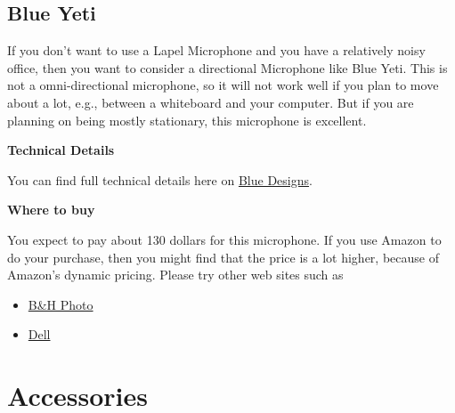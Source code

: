 \subsection{Blue Yeti}

\begin{gram}
If you don't want to use a Lapel Microphone and you have a relatively
noisy office, then you want to consider a directional Microphone like Blue Yeti.
%
This is not a omni-directional microphone, so it will not work well if you plan to move about a lot, e.g., between a whiteboard and your computer.  
%
But if you are planning on being mostly stationary, this microphone is excellent.

\textbf{Technical Details}

You can find full technical details here on \href{https://www.bluedesigns.com/products/yeti/}{Blue Designs}.


\textbf{Where to buy}

You expect to pay about 130 dollars for this microphone.  If you use Amazon to do your purchase, then you might find that the price is a lot higher, because of Amazon's dynamic pricing.  Please try other web sites such as 

\begin{itemize}
\item
\href{
https://www.bhphotovideo.com/c/product/1252288-REG/blue_yeti_whiteout_yeti_usb_microphone_whiteout.html/?ap=y&ap=y&smp=y&smp=y&lsft=BI%
\item 
\href{https://www.dell.com/en-us/shop/blue-microphones-yeti-microphone-usb-aztec-copper/apd/aa829519?gacd=9614064-1012-5761040-0-0&dgc=st&gclid=CjwKCAjwgdX4BRB_EiwAg8O8HUjMAfBK6gO_-L-fdNSOjOlY2YqmqpLKR2qxP7hb-yRx8xlw1bscKBoCk0wQAvD_BwE&gclsrc=aw.ds}{Dell}
\end{itemize}
\end{gram}

\section{Accessories}

